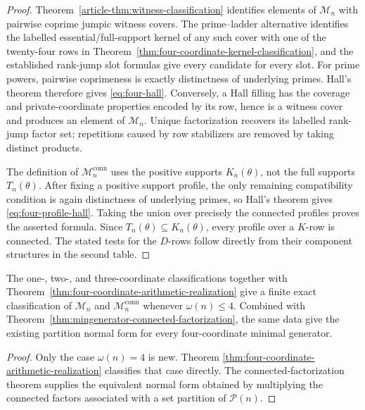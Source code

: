 \begin{proof}
Theorem~\ref{article-thm:witness-classification} identifies elements of
$\mathcal M_n$ with pairwise coprime jumpic witness covers.  The
prime--ladder alternative identifies the labelled essential/full-support
kernel of any such cover with one of the twenty-four rows in
Theorem~\ref{thm:four-coordinate-kernel-classification}, and the established
rank-jump slot formulas give every candidate for every slot.
For prime powers, pairwise coprimeness is exactly distinctness of underlying
primes.  Hall's theorem \cite[Chapter~2]{LovaszPlummer1986MatchingTheory}
therefore gives \eqref{eq:four-hall}.  Conversely, a Hall filling has the
coverage and private-coordinate properties encoded by its row, hence is a
witness cover and produces an element of $\mathcal M_n$.  Unique
factorization recovers its labelled rank-jump factor set; repetitions caused by
row stabilizers are removed by taking distinct products.

The definition of $\mathcal M_n^{\mathrm{conn}}$ uses the positive supports
$K_n(\theta)$, not the full supports $T_n(\theta)$.  After fixing a positive
support profile, the only remaining compatibility condition is again
distinctness of underlying primes, so Hall's theorem gives
\eqref{eq:four-profile-hall}.  Taking the union over precisely the connected
profiles proves the asserted formula.  Since $T_n(\theta)\subseteq
K_n(\theta)$, every profile over a $K$-row is connected.  The stated tests for
the $D$-rows follow directly from their component structures in the second
table.
\end{proof}

\begin{corollary}\label{cor:four-coordinate-minimal-classification}
The one-, two-, and three-coordinate classifications together with
Theorem~\ref{thm:four-coordinate-arithmetic-realization} give a finite exact
classification of $\mathcal M_n$ and $\mathcal M_n^{\mathrm{conn}}$ whenever
$\omega(n)\le4$.  Combined with
Theorem~\ref{thm:mingenerator-connected-factorization}, the same data give the
existing partition normal form for every four-coordinate minimal generator.
\end{corollary}

\begin{proof}
Only the case $\omega(n)=4$ is new.  Theorem
\ref{thm:four-coordinate-arithmetic-realization} classifies that case
directly.  The connected-factorization theorem supplies the equivalent
normal form obtained by multiplying the connected factors associated with a
set partition of $\mathcal P(n)$.
\end{proof}
